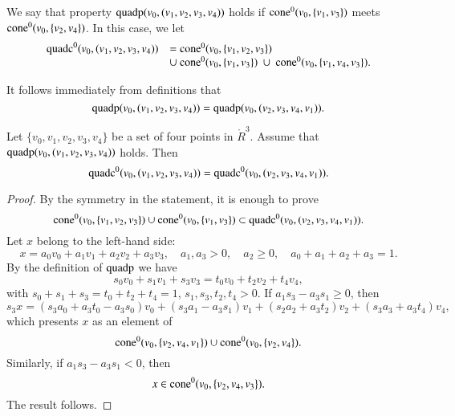 \begin{tarskidata}
\begin{tarski}
\begin{definition}
We say that property ${\operatorname{quadp}}(v_0,(v_1,v_2,v_3,v_4))$  holds if
${\operatorname{cone}}^0(v_0,\{v_1,v_3\})$ meets ${\operatorname{cone}}^0(v_0,\{v_2,v_4\})$.
In this case, we let 
 $$
  \begin{array}{lll}
   \op{quadc}^0(v_0,(v_1,v_2,v_3,v_4))&= 
    \op{cone}^0(v_0,\{v_1,v_2,v_3\})  \\
    &\cup \ \op{cone}^0(v_0,\{v_1,v_3\})\ \cup \ 
   \op{cone}^0(v_0,\{v_1,v_4,v_3\}).
  \end{array}
  $$
\end{definition}
It follows immediately from definitions that
  $${\operatorname{quadp}}(v_0,(v_1,v_2,v_3,v_4))={\operatorname{quadp}}(v_0,(v_2,v_3,v_4,v_1)).$$
\end{tarski}





\begin{tarski}
\tag{pt5, quadp, quadc, cone}

\begin{lemma}
Let $\{v_0,v_1,v_2,v_3,v_4\}$ be a set of four points in $\ring{R}^3$.
Assume that ${\operatorname{quadp}}(v_0,(v_1,v_2,v_3,v_4))$ holds.
Then 
 $${\operatorname{quadc}}^0(v_0,(v_1,v_2,v_3,v_4))  
  = {\operatorname{quadc}}^0(v_0,(v_2,v_3,v_4,v_1)).
 $$
\end{lemma}

\begin{proof}
By the symmetry in the statement, it is enough to prove 
  $${\operatorname{cone}}^0(v_0,\{v_1,v_2,v_3\})\cup{\operatorname{cone}}^0(v_0,\{v_1,v_3\})
  \subset {\operatorname{quadc}}^0(v_0,(v_2,v_3,v_4,v_1)).$$
Let $x$ belong to the left-hand side:
  $$
  x = a_0 v_0 + a_1 v_1 + a_2 v_2 + a_3 v_3,
  \quad a_1,a_3 > 0,\quad a_2\ge 0,\quad a_0+a_1+a_2+a_3=1.
  $$
By the definition of ${\operatorname{quadp}}$ we have
$$
  s_0 v_0 + s_1 v_1 + s_3 v_3 = t_0 v_0 + t_2 v_2 + t_4 v_4,
$$
with $s_0 + s_1 + s_3 = t_0 + t_2 + t_4 = 1$, $s_1,s_3,t_2,t_4>0$.
If $a_1 s_3 - a_3 s_1 \ge 0$, then
  $$s_3 x = (s_3 a_0 + a_3 t_0 - a_3 s_0) v_0 + 
          (s_3 a_1 - a_3 s_1) v_1 + (s_2 a_2 + a_3 t_2) v_2 +
          (s_3 a_3 + a_3 t_4) v_4,$$
which presents $x$ as an element of 
 $$
 {\operatorname{cone}}^0(v_0,\{v_2,v_4,v_1\}) \cup{\operatorname{cone}}^0(v_0,\{v_2,v_4\}).
 $$
Similarly, if $a_1 s_3 - a_3 s_1 < 0$, then
  $$
  x\in {\operatorname{cone}}^0(v_0,\{v_2,v_4,v_3\}).
  $$
The result follows.
\end{proof}
\end{tarski}







\end{tarskidata}
